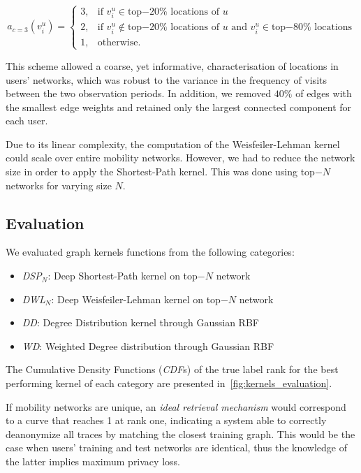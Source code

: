 \begin{equation*}
	a_{c=3}\left(v_i^u\right)=
	\begin{cases}
		 3, &  \mbox{if } v_i^u \in \mbox{top$-20\%$ locations of } u  \\
		 2, &  \mbox{if } v_i^u  \notin \mbox{top$-20\%$ locations of }  u   \mbox{ and }  v_i^u \in \mbox{top$-80\%$ locations}\\
		 1, &  \mbox{otherwise}.
	\end{cases}
\end{equation*}

This scheme allowed a coarse, yet informative, characterisation of locations in users' networks, which was robust to the variance in the frequency of visits between the two observation periods. In addition, we removed $40\%$ of edges with the smallest edge weights and retained only the largest connected component for each user.


Due to its linear complexity, the computation of the Weisfeiler-Lehman kernel could scale over entire mobility networks.
However, we had to reduce the network size in order to apply the Shortest-Path kernel.
This was done using top$-N$ networks for varying size $N$.



\subsection{Evaluation}

We evaluated graph kernels functions from the following categories:
\begin{itemize}
	\item \emph{DSP}$_{N}$: Deep Shortest-Path kernel on top$-N$ network
	\item \emph{DWL}$_{N}$: Deep Weisfeiler-Lehman kernel on top$-N$ network
	\item \emph{DD}: Degree Distribution kernel through Gaussian RBF
	\item \emph{WD}: Weighted Degree distribution through Gaussian RBF
\end{itemize}
The  Cumulative Density Functions (\emph{CDF}s) of the  true label rank for the best performing kernel of each category are presented in~\cref{fig:kernels_evaluation}.

If mobility networks are unique, an \emph{ideal retrieval mechanism} would correspond to a curve that reaches 1 at rank one, indicating a system able to correctly deanonymize all traces by matching the closest training graph.
This would be the case when users' training and test networks are identical, thus the knowledge of the latter implies maximum privacy loss.

